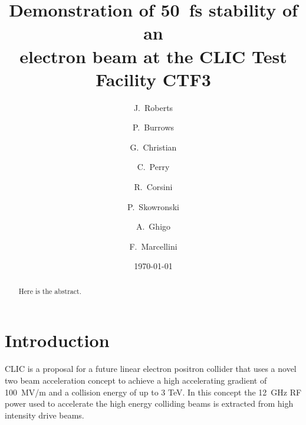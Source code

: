 \documentclass[%
 reprint,
 amsmath,amssymb,
 prl,
]{revtex4-1}
\begin{document}

\title{Demonstration of 50~fs stability of an \\ electron beam at the CLIC Test 
Facility CTF3}

\author{J.~Roberts}
\author{P.~Burrows}
\author{G.~Christian}
\author{C.~Perry}

\author{R.~Corsini}
\author{P.~Skowronski}

\author{A.~Ghigo}
\author{F.~Marcellini}

\date{\today}

\begin{abstract}
Here is the abstract.
\end{abstract}

\maketitle


\section{\label{s:intro}Introduction}

CLIC is a proposal for a future linear electron positron collider that uses a 
novel two 
beam acceleration concept to achieve a high accelerating gradient of 100~MV/m 
and a collision energy of up to 3 TeV. In this concept the 12~GHz RF power used 
to accelerate the high energy colliding beams is extracted from high intensity 
drive beams.
\end{document}
